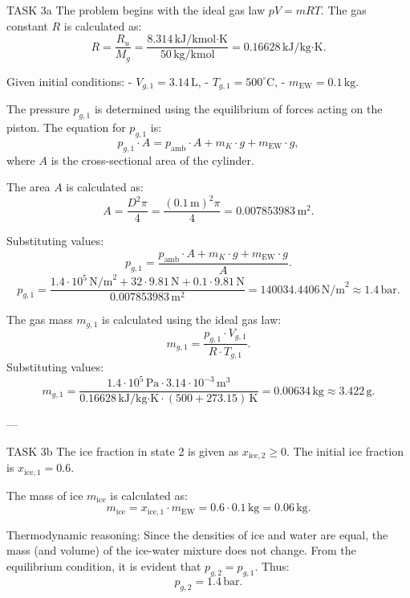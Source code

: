 TASK 3a  
The problem begins with the ideal gas law \( pV = mRT \). The gas constant \( R \) is calculated as:  
\[
R = \frac{R_u}{M_g} = \frac{8.314 \, \text{kJ/kmol·K}}{50 \, \text{kg/kmol}} = 0.16628 \, \text{kJ/kg·K}.
\]  

Given initial conditions:  
- \( V_{g,1} = 3.14 \, \text{L} \),  
- \( T_{g,1} = 500^\circ\text{C} \),  
- \( m_{\text{EW}} = 0.1 \, \text{kg} \).  

The pressure \( p_{g,1} \) is determined using the equilibrium of forces acting on the piston. The equation for \( p_{g,1} \) is:  
\[
p_{g,1} \cdot A = p_{\text{amb}} \cdot A + m_K \cdot g + m_{\text{EW}} \cdot g,
\]  
where \( A \) is the cross-sectional area of the cylinder.  

The area \( A \) is calculated as:  
\[
A = \frac{D^2 \pi}{4} = \frac{(0.1 \, \text{m})^2 \pi}{4} = 0.007853983 \, \text{m}^2.
\]  

Substituting values:  
\[
p_{g,1} = \frac{p_{\text{amb}} \cdot A + m_K \cdot g + m_{\text{EW}} \cdot g}{A}.
\]  
\[
p_{g,1} = \frac{1.4 \cdot 10^5 \, \text{N/m}^2 + 32 \cdot 9.81 \, \text{N} + 0.1 \cdot 9.81 \, \text{N}}{0.007853983 \, \text{m}^2} = 140034.4406 \, \text{N/m}^2 \approx 1.4 \, \text{bar}.
\]  

The gas mass \( m_{g,1} \) is calculated using the ideal gas law:  
\[
m_{g,1} = \frac{p_{g,1} \cdot V_{g,1}}{R \cdot T_{g,1}}.
\]  
Substituting values:  
\[
m_{g,1} = \frac{1.4 \cdot 10^5 \, \text{Pa} \cdot 3.14 \cdot 10^{-3} \, \text{m}^3}{0.16628 \, \text{kJ/kg·K} \cdot (500 + 273.15) \, \text{K}} = 0.00634 \, \text{kg} \approx 3.422 \, \text{g}.
\]  

---

TASK 3b  
The ice fraction in state 2 is given as \( x_{\text{ice},2} \geq 0 \). The initial ice fraction is \( x_{\text{ice},1} = 0.6 \).  

The mass of ice \( m_{\text{ice}} \) is calculated as:  
\[
m_{\text{ice}} = x_{\text{ice},1} \cdot m_{\text{EW}} = 0.6 \cdot 0.1 \, \text{kg} = 0.06 \, \text{kg}.
\]  

Thermodynamic reasoning:  
Since the densities of ice and water are equal, the mass (and volume) of the ice-water mixture does not change. From the equilibrium condition, it is evident that \( p_{g,2} = p_{g,1} \). Thus:  
\[
p_{g,2} = 1.4 \, \text{bar}.
\]